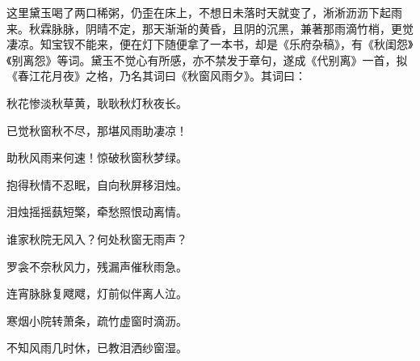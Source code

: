 \begin{parag}


    这里黛玉喝了两口稀粥，仍歪在床上，不想日未落时天就变了，淅淅沥沥下起雨来。秋霖脉脉，阴晴不定，那天渐渐的黄昏，且阴的沉黑，兼著那雨滴竹梢，更觉凄凉。知宝钗不能来，便在灯下随便拿了一本书，却是《乐府杂稿》，有《秋闺怨》《别离怨》等词。黛玉不觉心有所感，亦不禁发于章句，遂成《代别离》一首，拟《春江花月夜》之格，乃名其词曰《秋窗风雨夕》。其词曰：
\end{parag}
\begin{poem}

    \begin{pl}

        秋花惨淡秋草黄，耿耿秋灯秋夜长。
    \end{pl}
    \begin{pl}

        已觉秋窗秋不尽，那堪风雨助凄凉！
    \end{pl}
    \begin{pl}

        助秋风雨来何速！惊破秋窗秋梦绿。
    \end{pl}
    \begin{pl}

        抱得秋情不忍眠，自向秋屏移泪烛。
    \end{pl}
    \begin{pl}

        泪烛摇摇蓺短檠，牵愁照恨动离情。
    \end{pl}
    \begin{pl}

        谁家秋院无风入？何处秋窗无雨声？
    \end{pl}
    \begin{pl}

        罗衾不奈秋风力，残漏声催秋雨急。
    \end{pl}
    \begin{pl}

        连宵脉脉复飕飕，灯前似伴离人泣。
    \end{pl}
    \begin{pl}

        寒烟小院转萧条，疏竹虚窗时滴沥。
    \end{pl}
    \begin{pl}

        不知风雨几时休，已教泪洒纱窗湿。
    \end{pl}
\end{poem}

